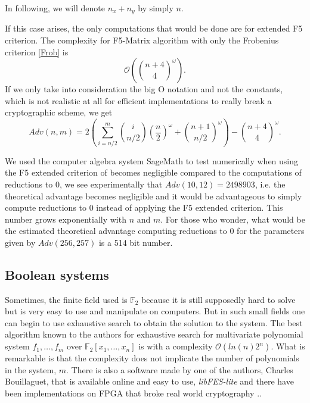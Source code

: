 \documentclass[english]{article}
\begin{document}
		In following, we will denote $n_x + n_y$ by simply $n$.
		
		If this case arises, the only computations that would be done are for extended F5 criterion. The complexity for F5-Matrix algorithm with only the Frobenius criterion \ref{Frob} is 
		$$
		\mathcal{O}\left(\binom{n + 4}{4}^\omega\right).
		$$
		If we only take into consideration the big O notation and not the constants, which is not realistic at all for efficient implementations to really break a cryptographic scheme, we get
		\begin{equation}
			Adv(n, m) = 2\left(\sum_{i = n/2}^{m}\binom{i}{n/2}\left(\frac{n}{2}\right)^\omega + \binom{n + 1}{n/2}^\omega\right) - \binom{n + 4}{4}^\omega.
			\label{equation_complex}
		\end{equation}
		
		We used the computer algebra system SageMath \cite{sagemath} to test numerically when using the F5 extended criterion of \cite{FSS11} becomes negligible compared to the computations of reductions to 0, we see experimentally that $Adv(10, 12) = 2498903$, i.e. the theoretical advantage becomes negligible and it would be advantageous to simply compute reductions to 0 instead of applying the F5 extended criterion. This number grows exponentially with $n$ and $m$. For those who wonder, what would be the estimated theoretical advantage computing reductions to 0 for the parameters given by \cite{HJ23} $Adv(256, 257)$ is a 514 bit number.
		
		\subsection{Boolean systems}
		Sometimes, the finite field used is $\mathbb{F}_2$ because it is still supposedly hard to solve but is very easy to use and manipulate on computers. But in such small fields one can begin to use exhaustive search to obtain the solution to the system. The best algorithm known to the authors for exhaustive search for multivariate polynomial system $f_1,\dots,f_m$ over $\mathbb{F}_2[x_1,\dots,x_n]$ is \cite{BCC+10} with a complexity $\mathcal{O}(ln(n)2^n)$. What is remarkable is that the complexity does not implicate the number of polynomials in the system, $m$. There is also a software made by one of the authors, Charles Bouillaguet, that is available online and easy to use, \textit{libFES-lite} \cite{Bouilla22} and there have been implementations on FPGA that broke real world cryptography \cite{DDVY20}..
		
\end{document}
